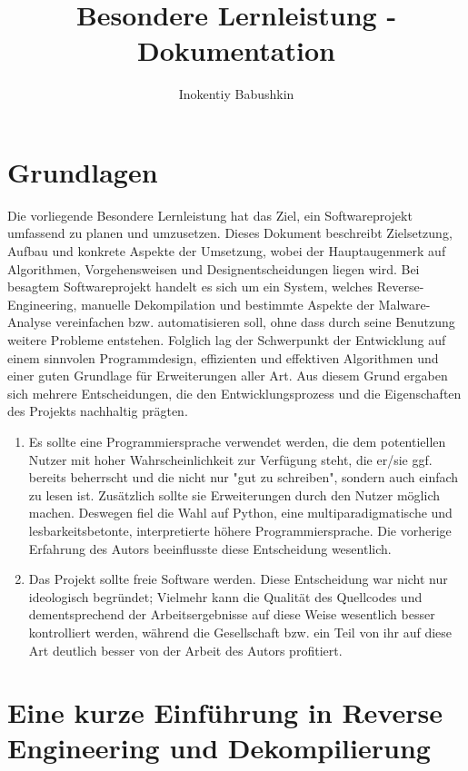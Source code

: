 \documentclass[11pt]{article} %
\title{Besondere Lernleistung - Dokumentation}
\author{Inokentiy Babushkin}
\begin{document}
\maketitle
\tableofcontents

\section{Grundlagen}
Die vorliegende Besondere Lernleistung hat das Ziel, ein Softwareprojekt
umfassend zu planen und umzusetzen.
Dieses Dokument beschreibt Zielsetzung, Aufbau und konkrete Aspekte der Umsetzung,
wobei der Hauptaugenmerk auf Algorithmen, Vorgehensweisen und Designentscheidungen liegen wird.
Bei besagtem Softwareprojekt handelt es sich um ein System, welches Reverse-Engineering, manuelle
Dekompilation und bestimmte Aspekte der Malware-Analyse vereinfachen bzw. automatisieren soll,
ohne dass durch seine Benutzung weitere Probleme entstehen. Folglich lag der Schwerpunkt der Entwicklung
auf einem sinnvolen Programmdesign, effizienten und effektiven Algorithmen und einer guten Grundlage
für Erweiterungen aller Art. Aus diesem Grund ergaben sich mehrere Entscheidungen, die den Entwicklungsprozess
und die Eigenschaften des Projekts nachhaltig prägten.
\begin{enumerate}
	\item{Es sollte eine Programmiersprache verwendet werden, die dem potentiellen Nutzer mit hoher
		Wahrscheinlichkeit zur Verfügung steht, die er/sie ggf. bereits beherrscht und die nicht nur
		"gut zu schreiben", sondern auch einfach zu lesen ist. Zusätzlich sollte sie Erweiterungen
		durch den Nutzer möglich machen. Deswegen fiel die Wahl auf Python, eine multiparadigmatische
		und lesbarkeitsbetonte, interpretierte höhere Programmiersprache. Die vorherige Erfahrung des
		Autors beeinflusste diese Entscheidung wesentlich.
	}
	\item{Das Projekt sollte freie Software werden. Diese Entscheidung war nicht nur ideologisch begründet;
		Vielmehr kann die Qualität des Quellcodes und dementsprechend der Arbeitsergebnisse auf diese Weise
		wesentlich besser kontrolliert werden, während die Gesellschaft bzw. ein Teil von ihr auf diese
		Art deutlich besser von der Arbeit des Autors profitiert.
	}
\end{enumerate}

\section{Eine kurze Einführung in Reverse Engineering und Dekompilierung}
\end{document}
